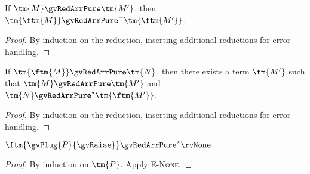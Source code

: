 
\begin{lemma}\label{lem:translate-term}
  If $\tm{M}\gvRedArrPure\tm{M'}$,
  then $\tm{\ftm{M}}\gvRedArrPure^{+}\tm{\ftm{M'}}$.
\end{lemma}
\begin{proof}
  By induction on the reduction, inserting additional reductions for error handling.
\end{proof}

\begin{lemma}
  If $\tm{\ftm{M}}\gvRedArrPure\tm{N}$,
  then there exists a term $\tm{M'}$ such that
  $\tm{M}\gvRedArrPure\tm{M'}$ and
  $\tm{N}\gvRedArrPure^{\star}\tm{\ftm{M'}}$.
\end{lemma}
\begin{proof}
  By induction on the reduction, inserting additional reductions for error handling.
\end{proof}

\begin{lemma}\label{lem:translate-raise}
  $\ftm{\gvPlug{P}{\gvRaise}}\gvRedArrPure^{\star}\rvNone$
\end{lemma}
\begin{proof}
  By induction on $\tm{P}$. Apply \textsc{E-None}.
\end{proof}

